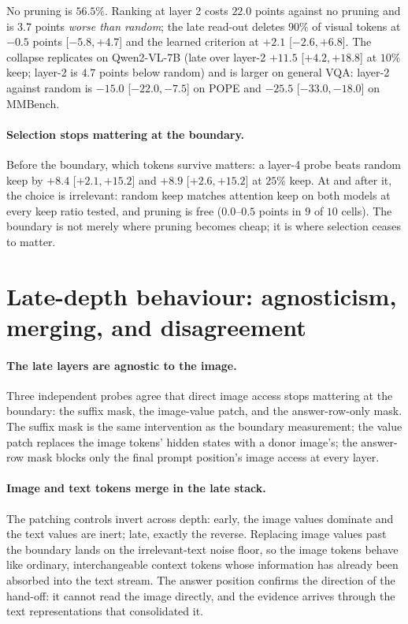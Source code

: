 No pruning is $56.5\%$. Ranking at layer 2 costs $22.0$ points against no pruning and is $3.7$ points
\emph{worse than random}; the late read-out deletes $90\%$ of visual tokens at $-0.5$ points [$-5.8,+4.7$] and
the learned criterion at $+2.1$ [$-2.6,+6.8$]. The collapse replicates on Qwen2-VL-7B (late over layer-2
$+11.5$ [$+4.2,+18.8$] at $10\%$ keep; layer-2 is $4.7$ points below random) and is larger on general VQA:
layer-2 against random is $-15.0$ [$-22.0,-7.5$] on POPE and $-25.5$ [$-33.0,-18.0$] on MMBench.

\paragraph{Selection stops mattering at the boundary.} Before the boundary, which tokens survive matters: a
layer-4 probe beats random keep by $+8.4$ [$+2.1,+15.2$] and $+8.9$ [$+2.6,+15.2$] at $25\%$ keep. At and after
it, the choice is irrelevant: random keep matches attention keep on both models at every keep ratio tested,
and pruning is free ($0.0$--$0.5$ points in $9$ of $10$ cells). The boundary is not merely where pruning
becomes cheap; it is where selection ceases to matter.

\section{Late-depth behaviour: agnosticism, merging, and disagreement}\label{app:late}

\paragraph{The late layers are agnostic to the image.} Three independent probes agree that direct image access stops
mattering at the boundary: the suffix mask, the image-value patch, and the answer-row-only mask. The suffix mask is
the same intervention as the boundary measurement; the value patch replaces the image tokens' hidden states with a
donor image's; the answer-row mask blocks only the final prompt position's image access at every layer.


\paragraph{Image and text tokens merge in the late stack.} The patching controls invert across depth: early, the image
values dominate and the text values are inert; late, exactly the reverse. Replacing image values past the boundary
lands on the irrelevant-text noise floor, so the image tokens behave like ordinary, interchangeable context tokens
whose information has already been absorbed into the text stream. The answer position confirms the direction of the
hand-off: it cannot read the image directly, and the evidence arrives through the text representations that
consolidated it.

